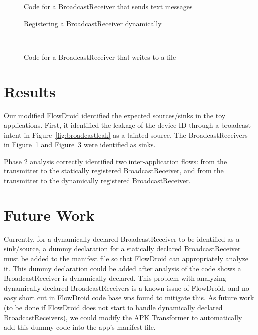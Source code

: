 \begin{figure}[!h]
\begin{framed}

\caption{Code for a BroadcastReceiver that sends text messages}
\label{fig:broadcaststaticrecvr}
\end{framed}
\end{figure}

\begin{figure}[!h]
\begin{framed}

\caption{Registering a BroadcastReceiver dynamically}
\label{fig:broadcastregister}
\end{framed}
\end{figure}

\
\begin{figure}[!h]
\begin{framed}

\caption{Code for a BroadcastReceiver that writes to a file}
\label{fig:broadcastdynrecvr}
\end{framed}
\end{figure}

\section{Results}

Our modified FlowDroid identified the expected sources/sinks in the toy applications. First, it identified the leakage of the device ID through a broadcast intent in Figure~\ref{fig:broadcastleak} as a tainted source. The BroadcastReceivers in Figure~\ref{fig:broadcaststaticrecvr} and Figure~\ref{fig:broadcastdynrecvr} were identified as sinks.

Phase 2 analysis correctly identified two inter-application flows: from the transmitter to the statically registered BroadcastReceiver, and from the transmitter to the dynamically registered BroadcastReceiver.

\section{Future Work}
Currently, for a dynamically declared BroadcastReceiver to be identified as a sink/source, a dummy declaration for a statically declared BroadcastReceiver must be added to the manifest file so that FlowDroid can appropriately analyze it. This dummy declaration could be added after analysis of the code shows a BroadcastReceiver is dynamically declared. This problem with analyzing dynamically declared BroadcastReceivers is a known issue of FlowDroid, and no easy short cut in FlowDroid code base was found to mitigate this. As future work (to be done if FlowDroid does not start to handle dynamically declared BroadcastReceivers), we could modify the APK Transformer to automatically add this dummy code into the app's manifest file.


